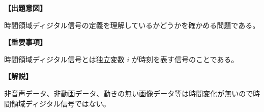 \noindent \textbf{【出題意図】}

\noindent 時間領域ディジタル信号の定義を理解しているかどうかを確かめる問題である。

\vspace{1em}
\noindent \textbf{【重要事項】}

\medskip
\noindent 時間領域ディジタル信号とは独立変数 $i$ が時刻を表す信号のことである。

\vspace{1em}
\noindent \textbf{【解説】}

\noindent 非音声データ、非動画データ、動きの無い画像データ等は時間変化が無いので時間領域ディジタル信号ではない。
